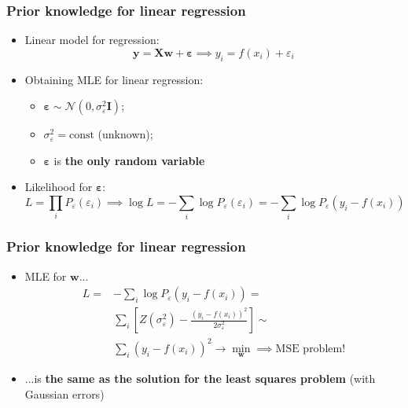 \documentclass[usenames,dvipsnames,aspectratio=169]{beamer}
\begin{document}
\begin{frame}
\frametitle{Prior knowledge for linear regression}

\begin{itemize}

  \item Linear model for regression:
  \[
    \bm{y} = \bm{X} \mathbf{w} + \bm{\varepsilon}
    \implies
    y_i = f(x_i) + \varepsilon_i
  \]

  \pause
  \item Obtaining MLE for linear regression:

  \begin{itemize}
    \item $\bm{\varepsilon} \sim \mathcal{N}(0, \sigma^2_\varepsilon \bm{I})$;
    \item $\sigma^2_\varepsilon = \mathrm{const}$ (unknown);
    \item $\bm{\varepsilon}$ is \textbf{the only random variable}
  \end{itemize}

  \pause
  \item Likelihood for $\bm{\varepsilon}$:
  \[
  L = \prod_i P_\varepsilon(\varepsilon_i)
  \implies 
  \log L = -\sum_i \log P_\varepsilon(\varepsilon_i)
         = -\sum_i \log P_\varepsilon(y_i - f(x_i))
  \]

\end{itemize}
\end{frame}



\begin{frame}
\frametitle{Prior knowledge for linear regression}

\begin{itemize}

  \item MLE for $\mathbf{w}$...
  \begin{align*}
  L = &-\sum_i \log P_\varepsilon(y_i - f(x_i) ) = \\
      & \sum_i \left[ 
        Z(\sigma^2_\varepsilon) - 
        \frac{(y_i - f(x_i))^2}
             {2 \sigma^2_\varepsilon}
        \right] \sim \\
      & \sum_i (y_i - f(x_i))^2 \to 
        \min\limits_{\mathbf{w}}
        \implies \text{MSE problem!}
  \end{align*}

  \pause
  \item ...is \textbf{the same as the solution
  for the least squares problem} (with Gaussian errors)

\end{itemize}

\end{frame}
\end{document}
